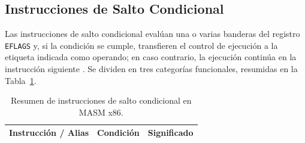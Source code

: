 \documentclass[a4paper,12pt]{article}
\begin{document}
\subsection{Instrucciones de Salto Condicional}
Las instrucciones de salto condicional evalúan una o varias banderas del registro \texttt{EFLAGS} y, si la condición se cumple, transfieren el control de ejecución a la etiqueta indicada como operando; en caso contrario, la ejecución continúa en la instrucción siguiente \cite{irvine2020assembly}. Se dividen en tres categorías funcionales, resumidas en la Tabla~\ref{tab:saltos}.

\begin{table}[H]
\centering
\caption{Resumen de instrucciones de salto condicional en MASM x86.}
\label{tab:saltos}
\renewcommand{\arraystretch}{1.25}
\setlength{\tabcolsep}{5pt}
\small
\begin{tabular}{
  >{\centering\arraybackslash}m{3.0cm}
  >{\centering\arraybackslash}m{2.5cm}
  >{\raggedright\arraybackslash}m{7.5cm}
}
\toprule
\rowcolor{VerdeUABC}
\color{white}\textbf{Instrucción / Alias} &
\color{white}\textbf{Condición} &
\color{white}\textbf{Significado} \\
\midrule


\end{tabular}
\end{table}
\end{document}
